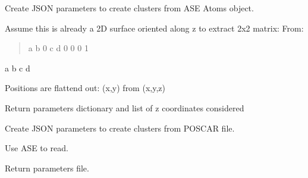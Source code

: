 \documentclass[letterpaper,10pt,english]{sphinxmanual}
\begin{document}
\begin{fulllineitems}
\label{\detokenize{tool_create_cluster:tool_create_cluster.params_from_ASE}}
\pysigstartsignatures
{}
\pysigstopsignatures
\sphinxAtStartPar
Create JSON parameters to create clusters from ASE Atoms object.

\sphinxAtStartPar
Assume this is already a 2D surface oriented along z to extract 2x2 matrix:
From:
\begin{quote}

\sphinxAtStartPar
a b 0
c d 0
0 0 1
\end{quote}
\begin{description}
\sphinxAtStartPar
a b
c d

\end{description}

\sphinxAtStartPar
Positions are flattend out: (x,y) from (x,y,z)

\sphinxAtStartPar
Return parameters dictionary and list of z coordinates considered

\end{fulllineitems}


\begin{fulllineitems}
\label{\detokenize{tool_create_cluster:tool_create_cluster.params_from_poscar}}
\pysigstartsignatures
{}
\pysigstopsignatures
\sphinxAtStartPar
Create JSON parameters to create clusters from POSCAR file.

\sphinxAtStartPar
Use ASE to read.

\sphinxAtStartPar
Return parameters file.

\end{fulllineitems}

\end{document}
